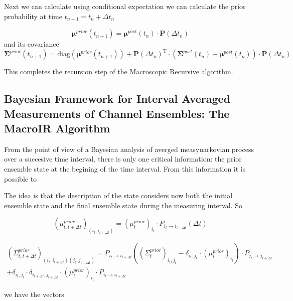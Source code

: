 \documentclass[pdflatex,sn-mathphys-num]{sn-jnl}%
\theoremstyle{thmstyleone}%
\theoremstyle{thmstyletwo}%
\theoremstyle{thmstylethree}%
\begin{document}
Next we can calculate using conditional expectation we can calculate the prior probability at time $t_{n+1}= t_n+\Delta t_n$  


\begin{equation}
	\mathbf \mu^{prior}(t_{n+1}) = \mathbf \mu^{post}(t_n) \cdot \mathbf P(\Delta t_n)
\end{equation}
and its covariance 
\begin{equation}
	\mathbf \Sigma^{prior}(t_{n+1})= \mathrm{diag}(\mathbf \mu^{prior}(t_{n+1}) ) + {\mathbf P(\Delta t_n)}^\mathrm{T} \cdot (\mathbf \Sigma^{post}(t_{n})- \mathbf \mu^{post}(t_{n})) \cdot \mathbf P(\Delta t_n)
\end{equation}

This completes the recursion step of the Macroscopic Recursive algorithm. 

\subsection{Bayesian Framework for Interval Averaged Measurements of Channel Ensembles: The MacroIR Algorithm}

From the point of view of a Bayesian analysis of averged measyuarkovian process over a succesive time interval, there is only one critical information: the prior ensemble state at the begining of the time interval. From this information it is possible to  


The idea is that the description of the state considers now both the initial ensemble state and the final ensemble state during the measuring interval. 
So 

\begin{equation}
	(\mu^{prior}_{t, t+ \Delta t})_{(i_t, i_{t+ \Delta t})} = (\mu^{prior}_{t})_{i_t}  \cdot P_{i_t \rightarrow i_{t+ \Delta t}}(\Delta t)
\end{equation}

\begin{multline}
	(\Sigma^{prior}_{t,t+ \Delta t})_{(i_t, i_{t+ \Delta t})(j_t, j_{t+ \Delta t})} =
	P_{i_t \rightarrow i_{t+ \Delta t}} \left((\Sigma^{prior}_{t})_{i_t ,j_t} - \delta_{i_t, j_t} \cdot (\mu^{prior}_t)_{i_t} \right)  \cdot P_{j_t \rightarrow j_{t+ \Delta t}} \\
	+ \delta_{i_t, j_t} \cdot \delta_{i_{t+ \Delta t}, j_{t+ \Delta t}} \cdot (\mu^{prior}_t)_{i_t}\cdot P_{i_t \rightarrow i_{t+ \Delta t}} 
\end{multline}

we have the vectors 
\end{document}
